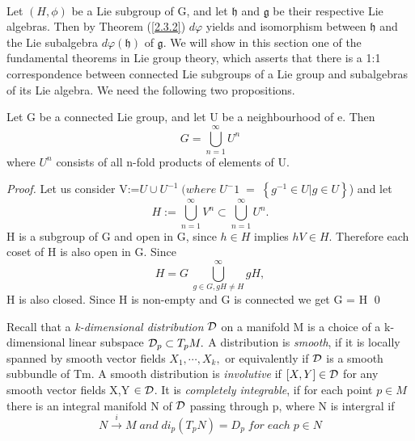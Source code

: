  \paragraph{}
 Let $(H,\phi)$ be a Lie subgroup of G, and let $\mathfrak{h}$ and $\mathfrak{g}$ be their respective Lie algebras. Then
 by Theorem (\ref{2.3.2}) $d \varphi$ yields and isomorphism between $\mathfrak{h}$ and the Lie subalgebra $d\varphi(\mathfrak{h})$
 of $\mathfrak{g}$.
 We will show in this section one of the fundamental theorems in Lie group theory, which asserts that there is a 1:1 
 correspondence between connected Lie subgroups of a Lie group and subalgebras of its Lie algebra.
 We need the following two propositions.
 \begin{proposition}
 Let G be a connected Lie group, and let U be a neighbourhood of e. Then
 \begin{equation*}
  G = \bigcup_{n=1}^\infty U^n
 \end{equation*}
where $U^n$ consists of all n-fold products of elements of U. 
\begin{proof}
 Let us consider V:=$U \cup U^{-1}\;(where\;U^-1\;=\;\left\lbrace g^{-1} \in U| g \in U \right\rbrace$)
 and let 
 \begin{equation*}
  H := \bigcup_{n=1}^{\infty} V^n \subset \bigcup_{n=1}^{\infty} U^n.
 \end{equation*}
 H is a subgroup of G and open in G, since $h \in H$ implies $hV \in H$. Therefore each coset of H is also open in G.
 Since 
 \begin{equation*}
  H = G \ \bigcup_{g \in G, gH \neq H}^{\infty} gH,
 \end{equation*}
H is also closed. Since H is non-empty and G is connected we get G = H
\qed
\end{proof}

 \end{proposition}
Recall that a \textit{k-dimensional distribution} $\mathcal{D}$ on a manifold M is a choice of a k-dimensional
linear subspace $\mathcal{D}_{p} \subset T_p M.$ A distribution is \textit{smooth}, if it is locally spanned by smooth 
vector fields $X_1,\cdots,X_k,$ or equivalently if $\mathcal{D}$ is a smooth subbundle of Tm. A smooth distribution
is \textit{involutive} if $[X,Y] \in \mathcal{D}$ for any smooth vector fields X,Y $\in \mathcal{D}$. It is \textit{completely
integrable}, if for each point $p \in M$ there is an integral manifold N of $\mathcal{D}$ passing through p,
where N is intergral if 
\begin{equation*}
 N \stackrel{i}{\rightarrow} M\; and\; di_{p}(T_{p}N) = D_{p} \; for \; each\; p \in N
\end{equation*}
